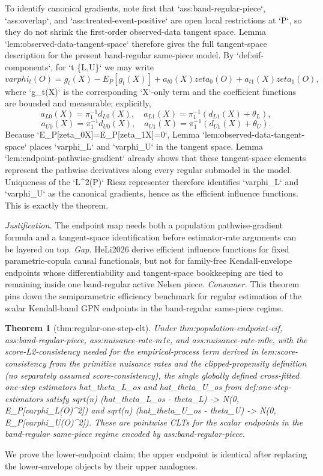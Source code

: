 \documentclass{article}
\newtheorem{theorem}{Theorem}
\begin{document}
To identify canonical gradients, note first that `ass:band-regular-piece`, `ass:overlap`, and `ass:treated-event-positive` are open local restrictions at `P`, so they do not shrink the first-order observed-data tangent space. Lemma `lem:observed-data-tangent-space` therefore gives the full tangent-space description for the present band-regular same-piece model. By `def:eif-components`, for `t \in \{L,U\}` we may write
\[
varphi_t(O)=g_t(X)-E_P[g_t(X)] + a_{t0}(X) zeta_0(O) + a_{t1}(X) zeta_1(O),
\]
where `g_t(X)` is the corresponding `X`-only term and the coefficient functions are bounded and measurable; explicitly,
\[
a_{L0}(X)=\pi_1^{-1} d_{L0}(X),\quad a_{L1}(X)=\pi_1^{-1}(d_{L1}(X)+\theta_L),
\]
\[
a_{U0}(X)=\pi_1^{-1} d_{U0}(X),\quad a_{U1}(X)=\pi_1^{-1}(d_{U1}(X)+\theta_U).
\]
Because `E_P[zeta_0\mid X]=E_P[zeta_1\mid X]=0`, Lemma `lem:observed-data-tangent-space` places `varphi_L` and `varphi_U` in the tangent space. Lemma `lem:endpoint-pathwise-gradient` already shows that these tangent-space elements represent the pathwise derivatives along every regular submodel in the model. Uniqueness of the `L^2(P)` Riesz representer therefore identifies `varphi_L` and `varphi_U` as the canonical gradients, hence as the efficient influence functions. This is exactly the theorem.
\par\smallskip\noindent \textit{Justification.} The endpoint map needs both a population pathwise-gradient formula and a tangent-space identification before estimator-rate arguments can be layered on top. \textit{Gap.} HeLi2026 derive efficient influence functions for fixed parametric-copula causal functionals, but not for family-free Kendall-envelope endpoints whose differentiability and tangent-space bookkeeping are tied to remaining inside one band-regular active Nelsen piece. \textit{Consumer.} This theorem pins down the semiparametric efficiency benchmark for regular estimation of the scalar Kendall-band GPN endpoints in the band-regular same-piece regime.

\begin{theorem}[thm:regular-one-step-clt]\label{thm:regular-one-step-clt}
Under thm:population-endpoint-eif, ass:band-regular-piece, ass:nuisance-rate-m1e, and ass:nuisance-rate-m0e, with the score-L2-consistency needed for the empirical-process term derived in lem:score-consistency from the primitive nuisance rates and the clipped-propensity definition (no separately assumed score-consistency), the single globally defined cross-fitted one-step estimators hat_theta_L_os and hat_theta_U_os from def:one-step-estimators satisfy sqrt(n) (hat_theta_L_os - theta_L) -> N(0, E_P[varphi_L(O)^2]) and sqrt(n) (hat_theta_U_os - theta_U) -> N(0, E_P[varphi_U(O)^2]). These are pointwise CLTs for the scalar endpoints in the band-regular same-piece regime encoded by ass:band-regular-piece.
\end{theorem}
We prove the lower-endpoint claim; the upper endpoint is identical after replacing the lower-envelope objects by their upper analogues.
\end{document}
